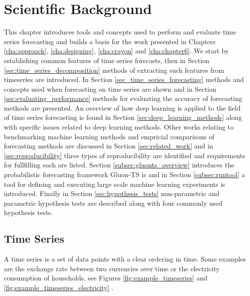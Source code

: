 \chapter{Scientific Background}
\label{cha:chapter2}
This chapter introduces tools and concepts used to perform and evaluate time series forecasting and builds a basis for the work presented in Chapters \ref{cha:approach}, \ref{cha:designing}, \ref{cha:crayon} and \ref{cha:chapter6}. We start by establishing common features of time series forecasts, then in Section \ref{sec:time_series_decomposition} methods of extracting such features from timeseries are introduced. In Section \ref{sec_time_series_forecasting} methods and concepts used when forecasting on time series are shown and in Section \ref{sec:evaluating_performance} methods for evaluating the accuracy of forecasting methods are presented. An overview of how deep learning is applied to the field of time series forecasting is found in Section \ref{sec:deep_learning_methods} along with specific issues related to deep learning methods. Other works relating to benchmarking machine learning methods and empricial comparisons of forecasting methods are discussed in Section \ref{sec:related_work} and in \ref{sec:reproducibility} three types of reproducibility are identified and requirements for fullfilling each are listed. Section \ref{subsec:gluonts_overview} introduces the probabilistic forecasting framework Gluon-TS is and in Section \ref{subsec:runtool} a tool for defining and executing large scale machine learning experiments is introduced. Finally in Section \ref{sec:hypothesis_tests} non-parametric and parametric hypothesis tests are described along with four commonly used hypothesis tests.

\section{Time Series}
A time series is a set of data points with a clear ordering in time. Some examples are the exchange rate between two currencies over time or the electricity consumption of households, see Figures \ref{fig:example_timeseries} and \ref{fig:example_timeseries_electricity} \cite{gluonts_paper}.

